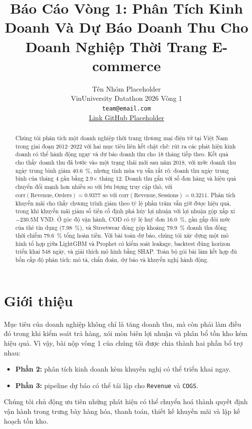 \documentclass[10pt,twocolumn]{article}
\title{\textbf{Báo Cáo Vòng 1: Phân Tích Kinh Doanh Và Dự Báo Doanh Thu Cho Doanh Nghiệp Thời Trang E-commerce}}
\author{
  Tên Nhóm Placeholder \\
  VinUniversity Datathon 2026 Vòng 1 \\
  \texttt{team@email.com} \\
  \href{https://github.com/your-team/your-repo}{Link GitHub Placeholder}
}
\date{}
\begin{document}
\maketitle

\begin{abstract}
Chúng tôi phân tích một doanh nghiệp thời trang thương mại điện tử tại Việt Nam trong giai đoạn 2012--2022 với hai mục tiêu liên kết chặt chẽ: rút ra các phát hiện kinh doanh có thể hành động ngay và dự báo doanh thu cho 18 tháng tiếp theo. Kết quả cho thấy doanh thu đã bước vào một trạng thái mới sau năm 2018, với mức doanh thu ngày trung bình giảm \SI{40.6}{\percent}, nhưng tính mùa vụ vẫn rất rõ: doanh thu ngày trung bình của tháng 4 gần bằng \num{2.9}$\times$ tháng 12. Doanh thu gắn với số đơn hàng và hiệu quả chuyển đổi mạnh hơn nhiều so với lưu lượng truy cập thô, với $\mathrm{corr}(\text{Revenue}, \text{Orders})=0.9377$ so với $\mathrm{corr}(\text{Revenue}, \text{Sessions})=0.3211$. Phân tích khuyến mãi cho thấy chương trình giảm theo tỷ lệ phần trăm vẫn giữ được hiệu quả, trong khi khuyến mãi giảm số tiền cố định phá hủy lợi nhuận với lợi nhuận gộp xấp xỉ \num{-230.5}M VND. Ở góc độ vận hành, COD có tỷ lệ huỷ đơn \SI{16.0}{\percent}, gần gấp đôi mức của thẻ tín dụng (\SI{7.98}{\percent}), và Streetwear đóng góp khoảng \SI{79.9}{\percent} doanh thu đồng thời chiếm \SI{79.6}{\percent} tổng hoàn tiền. Với bài toán dự báo, chúng tôi xây dựng một mô hình tổ hợp giữa LightGBM và Prophet có kiểm soát leakage, backtest đúng horizon triển khai 548 ngày, và giải thích mô hình bằng SHAP. Toàn bộ gói bài làm kết hợp đủ bốn cấp độ phân tích: mô tả, chẩn đoán, dự báo và khuyến nghị hành động.
\end{abstract}

\section{Giới thiệu}
Mục tiêu của doanh nghiệp không chỉ là tăng doanh thu, mà còn phải làm điều đó trong khi kiểm soát trả hàng, xói mòn biên lợi nhuận và phân bổ tồn kho kém hiệu quả. Vì vậy, bài nộp vòng 1 của chúng tôi được chia thành hai phần bổ trợ nhau:
\begin{itemize}
  \item \textbf{Phần 2:} phân tích kinh doanh kèm khuyến nghị có thể triển khai ngay.
  \item \textbf{Phần 3:} pipeline dự báo có thể tái lập cho \texttt{Revenue} và \texttt{COGS}.
\end{itemize}
Chúng tôi chủ động ưu tiên những phát hiện có thể chuyển hoá thành quyết định vận hành trong trưng bày hàng hóa, thanh toán, thiết kế khuyến mãi và lập kế hoạch tồn kho.
\end{document}
